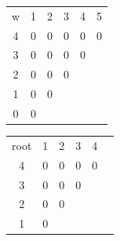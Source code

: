 \documentclass{article}
\begin{document}
\begin{tabular}{ c | c | c | c | c | c}         
w & 1 & 2 & 3 & 4 & 5 \\ 
4 & 0 & 0 & 0 & 0 & 0\\  
3 & 0 & 0 & 0 & 0\\
2 & 0 & 0 & 0\\
1 & 0 & 0 \\   
0 & 0     
\end{tabular}

\begin{tabular}{ c | c | c | c | c | c}         
root & 1 & 2 & 3 & 4  \\ 
4    & 0 & 0 & 0 & 0 \\  
3    & 0 & 0 & 0 \\
2    & 0 & 0 \\
1    & 0 \\   
\end{tabular}
\end{document}
